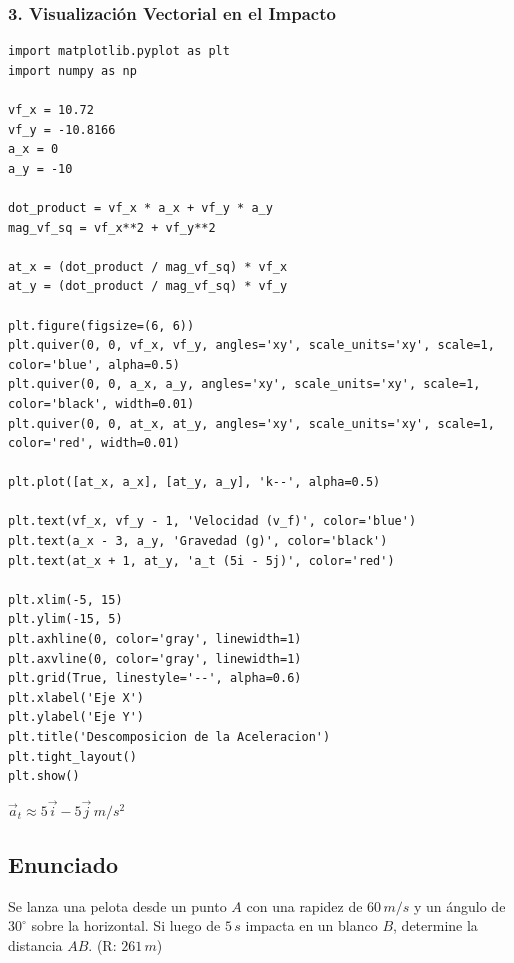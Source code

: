 \documentclass[12pt, a4paper]{article}
\begin{document}
\subsubsection*{3. Visualización Vectorial en el Impacto}
\begin{verbatim}
import matplotlib.pyplot as plt
import numpy as np

vf_x = 10.72
vf_y = -10.8166
a_x = 0
a_y = -10

dot_product = vf_x * a_x + vf_y * a_y
mag_vf_sq = vf_x**2 + vf_y**2

at_x = (dot_product / mag_vf_sq) * vf_x
at_y = (dot_product / mag_vf_sq) * vf_y

plt.figure(figsize=(6, 6))
plt.quiver(0, 0, vf_x, vf_y, angles='xy', scale_units='xy', scale=1, color='blue', alpha=0.5)
plt.quiver(0, 0, a_x, a_y, angles='xy', scale_units='xy', scale=1, color='black', width=0.01)
plt.quiver(0, 0, at_x, at_y, angles='xy', scale_units='xy', scale=1, color='red', width=0.01)

plt.plot([at_x, a_x], [at_y, a_y], 'k--', alpha=0.5)

plt.text(vf_x, vf_y - 1, 'Velocidad (v_f)', color='blue')
plt.text(a_x - 3, a_y, 'Gravedad (g)', color='black')
plt.text(at_x + 1, at_y, 'a_t (5i - 5j)', color='red')

plt.xlim(-5, 15)
plt.ylim(-15, 5)
plt.axhline(0, color='gray', linewidth=1)
plt.axvline(0, color='gray', linewidth=1)
plt.grid(True, linestyle='--', alpha=0.6)
plt.xlabel('Eje X')
plt.ylabel('Eje Y')
plt.title('Descomposicion de la Aceleracion')
plt.tight_layout()
plt.show()
\end{verbatim}

\begin{tcolorbox}[colback=green!5!white, colframe=green!50!black, title=Respuesta Final]
\centering \Large $\vec{a}_t \approx 5\vec{i} - 5\vec{j} \, \si{m/s^2}$
\end{tcolorbox}

\newpage

\subsection*{Enunciado}
Se lanza una pelota desde un punto $A$ con una rapidez de $60 \, \si{m/s}$ y un ángulo de $30^\circ$ sobre la horizontal. Si luego de $5 \, \si{s}$ impacta en un blanco $B$, determine la distancia $AB$. (R: $261 \, \si{m}$)
\end{document}
